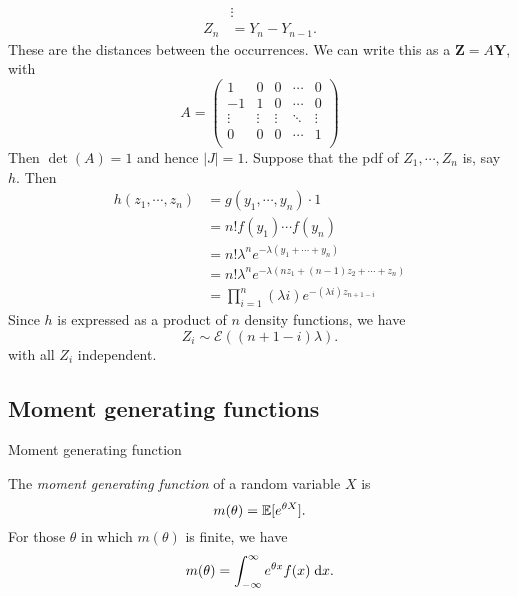 \begin{note}
\begin{field}
\begin{eg}
\begin{align*}
        &\vdots\\
        Z_n &= Y_n - Y_{n - 1}.
      \end{align*}
      These are the distances between the occurrences. We can write this as a $\mathbf{Z} = A\mathbf{Y}$, with
      \[
        A =
        \begin{pmatrix}
          1 & 0 & 0 & \cdots& 0\\
          -1 & 1 & 0 & \cdots & 0\\
          \vdots & \vdots & \vdots & \ddots & \vdots\\
          0 & 0 & 0 & \cdots & 1\\
        \end{pmatrix}
      \]
      Then $\det (A) = 1$ and hence $|J| = 1$. Suppose that the pdf of $Z_1, \cdots, Z_n$ is, say $h$. Then
      \begin{align*}
        h(z_1, \cdots, z_n) &= g(y_1, \cdots, y_n)\cdot 1\\
        &= n!f(y_1) \cdots f(y_n)\\
        &= n!\lambda^n e^{-\lambda (y_1 + \cdots + y_n)}\\
        &= n!\lambda^n e^{-\lambda (nz_1 + (n - 1)z_2 + \cdots + z_n)}\\
        &= \prod_{i = 1}^n (\lambda i)e^{-(\lambda i)z_{n + 1 - i}}
      \end{align*}
      Since $h$ is expressed as a product of $n$ density functions, we have
      \[
        Z_i \sim \mathcal{E}((n + 1 - i)\lambda).
      \]
      with all $Z_i$ independent.
    \end{eg}
  \end{field}
  \xplain{}%
\end{note}

\subsection{Moment generating functions}

%
\begin{note}
  \begin{field}
    Moment generating function
  \end{field}
  \begin{field}
    \begin{defi}
      The \emph{moment generating function} of a random variable $X$ is
      \[
        m(\theta) = \mathbb{E}[e^{\theta X}].
      \]
      For those $\theta$ in which $m(\theta)$ is finite, we have
      \[
        m(\theta) = \int_{-\infty}^\infty e^{\theta x}f(x)\;\mathrm{d} x.
      \]
    \end{defi}
  \end{field}
  \xplain{}%
\end{note}

